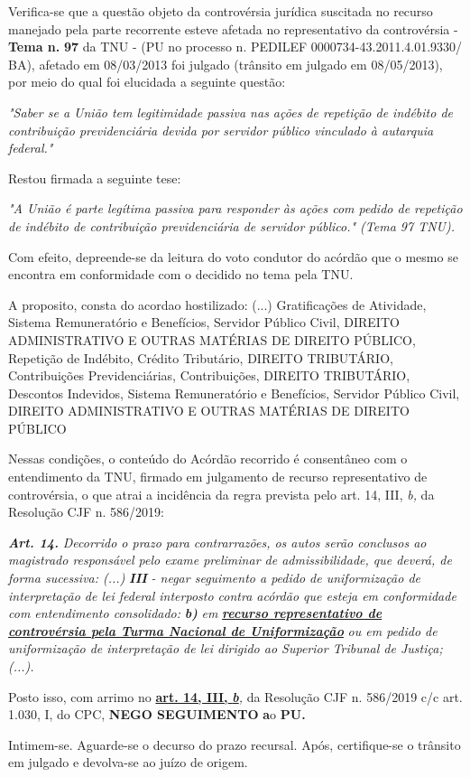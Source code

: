 \documentclass[12pt]{article}
\begin{document}
\justifying
\noindent Verifica-se que a questão objeto da controvérsia jurídica suscitada no recurso manejado pela parte recorrente esteve afetada no representativo da controvérsia - \textbf{Tema n. }\textbf{97} da TNU - (PU no processo n. PEDILEF 0000734-43.2011.4.01.9330/ BA),  afetado em 08/03/2013 foi julgado (trânsito em julgado em 08/05/2013), por meio do qual foi elucidada a seguinte questão:

\noindent \textit{"Saber se a União tem legitimidade passiva nas ações de repetição de indébito de contribuição previdenciária devida por servidor público vinculado à autarquia federal."}

\noindent Restou firmada a seguinte tese:

\noindent \textit{"A União é parte legítima passiva para responder às ações com pedido de repetição de indébito de contribuição previdenciária de servidor público." (Tema 97 TNU).}

\noindent Com efeito, depreende-se da leitura do voto condutor do acórdão que o mesmo se encontra em conformidade com o decidido no  tema pela TNU.

\noindent A proposito, consta do acordao hostilizado: (...) Gratificações de Atividade, Sistema Remuneratório e Benefícios, Servidor Público Civil, DIREITO ADMINISTRATIVO E OUTRAS MATÉRIAS DE DIREITO PÚBLICO, Repetição de Indébito, Crédito Tributário, DIREITO TRIBUTÁRIO, Contribuições Previdenciárias, Contribuições, DIREITO TRIBUTÁRIO, Descontos Indevidos, Sistema Remuneratório e Benefícios, Servidor Público Civil, DIREITO ADMINISTRATIVO E OUTRAS MATÉRIAS DE DIREITO PÚBLICO

\noindent Nessas condições, o conteúdo do Acórdão recorrido é consentâneo com o entendimento da TNU, firmado em julgamento de recurso representativo de controvérsia, o que atrai a incidência da regra prevista pelo art. 14, III, \textit{b,} da Resolução CJF n. 586/2019:

\noindent \textit{\textbf{Art. 14.}}\textit{ Decorrido o prazo para contrarrazões, os autos serão conclusos ao magistrado responsável pelo exame preliminar de admissibilidade, que deverá, de forma sucessiva: (...) }\textit{\textbf{III }}\textit{- negar seguimento a pedido de uniformização de interpretação de lei federal interposto contra acórdão que esteja em conformidade com entendimento consolidado: }\textit{\textbf{b)}}\textit{ em }\uline{\textit{\textbf{recurso representativo de controvérsia pela Turma Nacional de Uniformização}}}\textit{ ou em pedido de uniformização de interpretação de lei dirigido ao Superior Tribunal de Justiça;(...).}

\noindent Posto isso, com arrimo no \uline{\textbf{art. 14, III, }}\uline{\textit{\textbf{b}}}\textit{,} da Resolução CJF n. 586/2019 c/c art. 1.030, I, do CPC, \textbf{NEGO SEGUIMENTO }\textbf{a}o\textbf{ PU}\textbf{.}

\noindent Intimem-se. Aguarde-se o decurso do prazo recursal. Após, certifique-se o trânsito em julgado e devolva-se ao juízo de origem.
\end{document}
